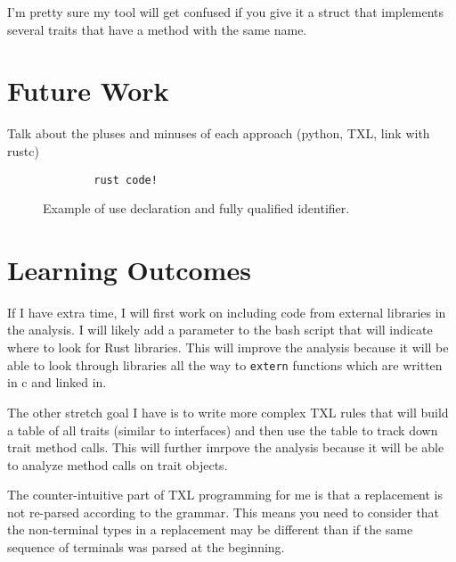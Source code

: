 \documentclass[11pt]{article}
\begin{document}
I'm pretty sure my tool will get confused if you give it a struct that implements several traits that have a method with the same name.

\section{Future Work}

Talk about the pluses and minuses of each approach (python, TXL, link with rustc)


\begin{figure}
    \caption{Example of use declaration and fully qualified identifier.}
    \label{fig:qualifiers}
    \begin{lstlisting}
        rust code!
    \end{lstlisting}
\end{figure}

\section{Learning Outcomes}
If I have extra time, I will first work on including code from external libraries in the analysis.
I will likely add a parameter to the bash script that will indicate where to look for Rust libraries.
This will improve the analysis because it will be able to look through libraries all the way to \lstinline{extern} functions which are written in c and linked in.

The other stretch goal I have is to write more complex TXL rules that will build a table of all traits (similar to interfaces) and then use the table to track down trait method calls.
This will further imrpove the analysis because it will be able to analyze method calls on trait objects.

The counter-intuitive part of TXL programming for me is that a replacement is not re-parsed according to the grammar.
This means you need to consider that the non-terminal types in a replacement may be different than if the same sequence of terminals was parsed at the beginning.
\end{document}
